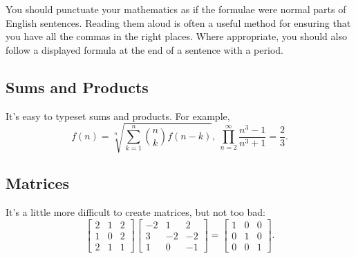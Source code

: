 \documentclass{icmmcm}
\begin{document}
{You should punctuate your mathematics as if the formulae were normal
parts of English sentences.  Reading them aloud is often a useful
method for ensuring that you have all the commas in the right places.
Where appropriate, you should also follow a displayed formula at the
end of a sentence with a period.

\subsection{Sums and Products}%
\label{sec:sums-n-products}

It's easy to typeset sums and products.  For example,
\begin{equation}
f(n) = \sqrt[n]{\sum_{k=1}^{n} {n \choose k} f \left( n - k \right)},~
\prod_{n=2}^{\infty} \frac{n^{3}-1}{n^{3}+1} = \frac{2}{3}.
\end{equation}



\subsection{Matrices}%
\label{sec:matrices}

It's a little more difficult to create matrices, but not too bad:
\begin{equation}
\left[ \begin{array}{ccc}
     2 & 1 & 2\\
     1 & 0 & 2\\
     2 & 1 & 1
     \end{array} \right]
\left[ \begin{array}{ccc}
     -2 & 1 & 2\\
     3 & -2 & -2\\
     1 & 0 & -1
     \end{array} \right] = 
\left[ \begin{array}{ccc}
     1 & 0 & 0\\
     0 & 1 & 0\\
     0 & 0 & 1
     \end{array} \right].
\end{equation}


}
\end{document}
